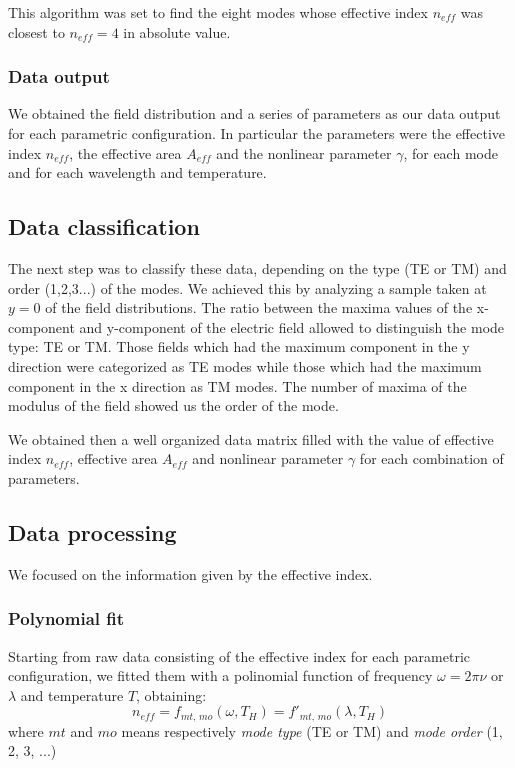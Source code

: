 \documentclass[12pt,a4paper,twoside]{article}
\begin{document}
This algorithm was set to find the eight modes whose effective index $n_{eff}$ was closest to $n_{eff}=4$ in absolute value.
\subsubsection{Data output}
We obtained the field distribution and a series of parameters as our data output for each parametric configuration.
In particular the parameters were the effective index $n_{eff}$, the effective area $A_{eff}$ and the nonlinear parameter $\gamma$, for each mode and for each wavelength and temperature.

\subsection{Data classification}
The next step was to classify these data, depending on the type (TE or TM) and order (1,2,3...) of the modes.
We achieved this by analyzing a sample taken at $y=0$ of the field distributions.
The ratio between the maxima values of the x-component and y-component of the electric field allowed to distinguish the mode type: TE or TM.
Those fields which had the maximum component in the y direction were categorized as TE modes while those which had the maximum component in the x direction as TM modes.
The number of maxima of the modulus of the field showed us the order of the mode.

We obtained then a well organized data matrix filled with the value of effective index $n_{eff}$, effective area $A_{eff}$ and nonlinear parameter $\gamma$ for each combination of parameters.

\subsection{Data processing}
We focused on the information given by the effective index.

\subsubsection{Polynomial fit}
Starting from raw data consisting of the effective index for each parametric configuration, we fitted them with a polinomial function of frequency $\omega = 2\pi \nu$ or $\lambda$ and temperature $T$, obtaining:
$$n_{eff} = f_{mt,\,mo} \left( \omega, T_H \right) = f'_{mt,\,mo} \left( \lambda, T_H \right)$$
where $mt$ and $mo$ means respectively \textit{mode type} (TE or TM) and \textit{mode order} (1, 2, 3, ...)
\end{document}
